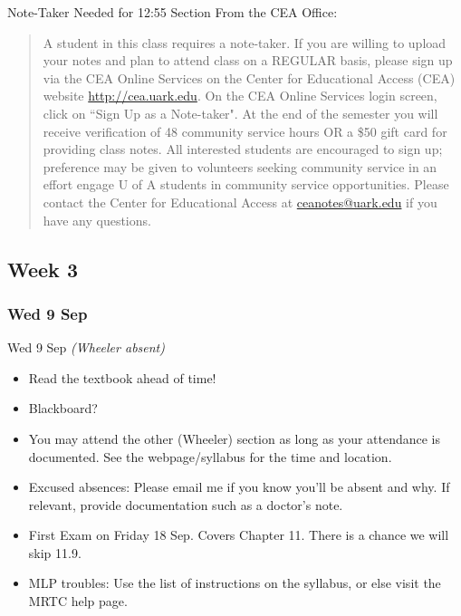 \documentclass[12pt]{beamer}
\theoremstyle{plain}
\theoremstyle{definition}
\begin{document}
\begin{frame}{\small Note-Taker Needed for 12:55 Section}\footnotesize
From the CEA Office:

\begin{quotation}%
A student in this class requires a note-taker. If you are willing to upload your notes and plan to attend class on a REGULAR basis, please sign up via the CEA Online Services on the Center for Educational Access (CEA) website \url{http://cea.uark.edu}. On the CEA Online Services login screen, click on ``Sign Up as a Note-taker". 
%
At the end of the semester you will receive verification of 48 community service hours OR a \$50 gift card for providing class notes. All interested students are encouraged to sign up; preference may be given to volunteers seeking community service in an effort engage U of A students in community service opportunities. 
%
Please contact the Center for Educational Access at \url{ceanotes@uark.edu} if you have any questions.
\end{quotation}
\end{frame}

\subsection{Week 3}
\subsubsection{Wed 9 Sep}
\begin{frame}{Wed 9 Sep {\it \small (Wheeler absent)}}\footnotesize
\begin{itemize}
\item Read the textbook ahead of time!
\item Blackboard?
\item You may attend the other (Wheeler) section as long as your attendance is documented.  See the webpage/syllabus for the time and location.
\item Excused absences: Please email me if you know you'll be absent and why.  If relevant, provide documentation such as a doctor's note.
\item First Exam on Friday 18 Sep.  Covers Chapter 11.  There is a chance we will skip 11.9.
\item MLP troubles: Use the list of instructions on the syllabus, or else visit the MRTC help page.
\end{itemize}
\end{frame}
\end{document}
